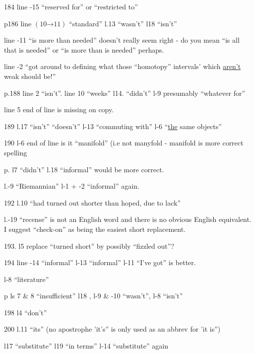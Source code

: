 184 line -15 ``reserved for'' or ``restricted to''

p186 line $(10\mathord{\to}11)$ ``standard'' l.13 ``wasn't'' l18 ``isn't''

line -11 ``is more than needed'' doesn't really seem right - do you mean ``is all that is needed'' or ``is more than is needed'' perhaps.

line -2 ``got around to defining  what those ``homotopy'' intervals' which \uline{aren't} weak should be!''

p.188 line 2 ``isn't''. line 10 ``weeks'' l14. ``didn't'' l-9 presumably ``whatever for''

line 5  end of line is missing on copy.

189 l.17 ``isn't'' ``doesn't'' l-13 ``commuting with'' l-6 ``\uline{the} same objects''

190 l-6 end of line is it ``manifold'' (i.e not manyfold - manifold is  more correct spelling


p. l7 ``didn't'' l.18 ``informal'' would be more correct.

l.-9 ``Riemannian'' l-1 + -2 ``informal'' again.

192 l.10 ``had turned out shorter than hoped, due to lack''

l.-19 ``recense'' is not an English word and there is no obvious English equivalent. I suggest ``check-on'' as being the easiest short replacement.

193. l5  replace ``turned short'' by possibly ``fizzled out''?

 194 line -14 ``informal'' l-13 ``informal'' l-11 ``I've got'' is better.

l-8 ``literature''

p ls 7 \& 8 ``insufficient'' l18  , l-9 \& -10 ``wasn't'', l-8 ``isn't''

198 l4 ``don't''

200 l.11 ``its'' (no apostrophe 'it's'' is only used as an abbrev for 'it is'')

l17 ``substitute'' l19 ``in terms'' l-14 ``substitute'' again

